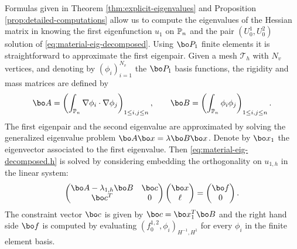 Formulas given in Theorem \ref{thm:explicit-eigenvalues} and Proposition \ref{prop:detailed-computations} allow us to compute the eigenvalues of the Hessian matrix in knowing the first eigenfunction $u_1$ on $\Bbb{P}_n$ and the pair $(U_0^1,U_0^2)$ solution of \eqref{eq:material-eig-decomposed}. Using ${\bo P_1}$ finite elements it is straightforward to approximate the first eigenpair. Given a mesh $\mathcal T_h$ with $N_v$ vertices, and denoting by $(\phi_i)_{i=1}^{N_v}$ the ${\bo P_1}$ basis functions, the rigidity and mass matrices are defined by
\[
\bo A = \left(\int_{\Bbb P_n} \nabla \phi_i \cdot \nabla \phi_j\right)_{1\leq i,j\leq n},\qquad \bo B = \left(\int_{\Bbb P_n} \phi_i \phi_j\right)_{1\leq i,j\leq n}.
\]
The first eigenpair and the second eigenvalue are approximated by solving the generalized eigenvalue problem $\bo A \bo x = \lambda \bo B \bo x$. Denote by $\bo x_1$ the eigenvector associated to the first eigenvalue. Then \eqref{eq:material-eig-decomposed.h} is solved by considering embedding the orthogonality on $u_{1,h}$ in the linear system:
\[
\begin{pmatrix}
\bo A - \lambda_{1,h} \bo B & \bo c \\
\bo c^T & 0
\end{pmatrix}
\begin{pmatrix}
\bo x \\ \ell
\end{pmatrix}
= \begin{pmatrix}
\bo f \\
0
\end{pmatrix}.
\]
The constraint vector $\bo c$ is given by $\bo c = \bo x_1^T \bo B$ and the right hand side $\bo f$ is computed by evaluating $(f_0^{1,2},\phi_i)_{H^{-1},H^1}$ for every $\phi_i$ in the finite element basis.

